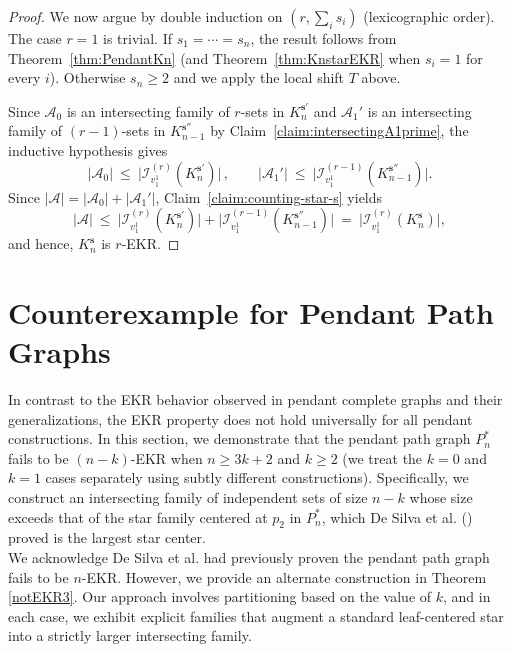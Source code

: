 \documentclass{article}
\theoremstyle{definition}
\newcommand{\A}{\mathcal{A}}
\newcommand{\s}{\mathbf{s}}
\newcommand{\1}{\mathbf{1}}
\begin{document}
\begin{proof}
\bigskip

We now argue by double induction on $(r,\sum_i s_i)$ (lexicographic order). The case $r=1$ is trivial. If $s_1=\cdots=s_n$, the result follows from Theorem~\ref{thm:PendantKn} (and Theorem~\ref{thm:KnstarEKR} when $s_i=1$ for every $i$). Otherwise $s_n\ge 2$ and we apply the local shift $T$ above.

Since $\A_0$ is an intersecting family of $r$-sets in $K_n^{\s'}$ and $\A_1'$ is an intersecting family of $(r-1)$-sets in $K_{n-1}^{\s''}$ by Claim~\ref{claim:intersectingA1prime}, the inductive hypothesis gives
\[
|\A_0|\ \le\ \bigl|\mathcal{I}^{(r)}_{v_1^1}(K_n^{\s'})\bigr|\,,\qquad
|\A_1'|\ \le\ \bigl|\mathcal{I}^{(r-1)}_{v_1^1}(K_{n-1}^{\s''})\bigr|.
\]
Since $|\A|=|\A_0|+|\A_1'|$, Claim~\ref{claim:counting-star-s} yields
\[
|\A|\ \le\ \bigl|\mathcal{I}^{(r)}_{v_1^1}(K_n^{\s'})\bigr|+\bigl|\mathcal{I}^{(r-1)}_{v_1^1}(K_{n-1}^{\s''})\bigr|
\ =\ \bigl|\mathcal{I}^{(r)}_{v_1^1}(K_n^{\s})\bigr|,
\]
and hence, $K_n^{\s}$ is $r$-EKR.
\end{proof}







\section{Counterexample for Pendant Path Graphs}\label{sec5}

\noindent In contrast to the EKR behavior observed in pendant complete graphs and their generalizations, the EKR property does not hold universally for all pendant constructions. In this section, we demonstrate that the pendant path graph $P_n^*$ fails to be $(n-k)$-EKR when $n \ge 3k + 2$ and $k\geq 2$ (we treat the $k=0$ and $k=1$ cases separately using subtly different constructions). Specifically, we construct an intersecting family of independent sets of size $n-k$ whose size exceeds that of the star family centered at $p_2$ in $P_n^*$, which De Silva et al. (\cite{DeSilvaDDH2023}) proved is the largest star center.\\

\noindent We acknowledge De Silva et al. had previously proven the pendant path graph fails to be $n$-EKR. However, we provide an alternate construction in Theorem \ref{notEKR3}. Our approach involves partitioning based on the value of $k$, and in each case, we exhibit explicit families that augment a standard leaf-centered star into a strictly larger intersecting family.
\end{document}
